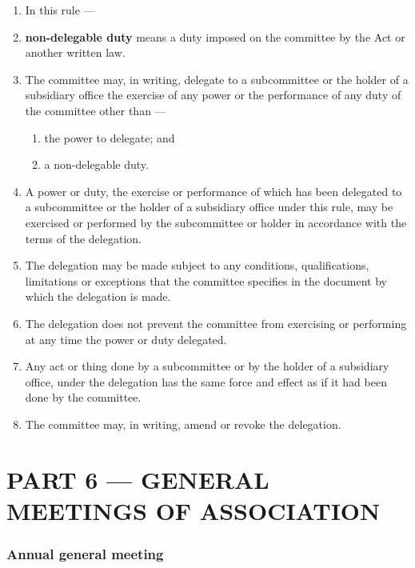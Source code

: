 \begin{enumerate}

\item In this rule ---
\item \textbf{non-delegable duty} means a duty imposed on the committee by the Act or another written law.
\item The committee may, in writing, delegate to a subcommittee or the holder of a subsidiary office the exercise of any power or the performance of any duty of the committee other than ---

  \begin{enumerate}
  
  \item the power to delegate; and
  \item a non-delegable duty.
  \end{enumerate}
\item A power or duty, the exercise or performance of which has been delegated to a subcommittee or the holder of a subsidiary office under this rule, may be exercised or performed by the subcommittee or holder in accordance with the terms of the delegation.
\item The delegation may be made subject to any conditions, qualifications, limitations or exceptions that the committee specifies in the document by which the delegation is made.
\item The delegation does not prevent the committee from exercising or performing at any time the power or duty delegated.
\item Any act or thing done by a subcommittee or by the holder of a subsidiary office, under the delegation has the same force and effect as if it had been done by the committee.
\item The committee may, in writing, amend or revoke the delegation.
\end{enumerate}

\hypertarget{part-6-general-meetings-of-association}{%
\part{PART 6 --- GENERAL MEETINGS OF ASSOCIATION}\label{part-6-general-meetings-of-association}}

\hypertarget{annual-general-meeting}{%
\section{Annual general meeting}\label{annual-general-meeting}}

